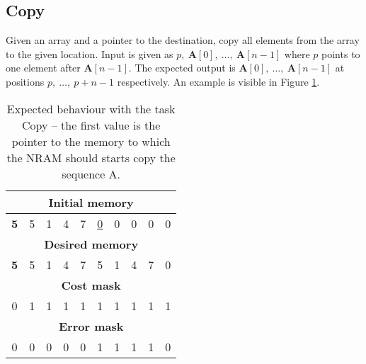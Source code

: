 \subsection{Copy}
Given an array and a pointer to the destination, copy all elements from the array to the given location. Input is given as $p,\ \textbf{A}[0],\ \dots,\ \textbf{A}[n-1]$ where $p$ points to one element after $\textbf{A}[n-1]$. The expected output is $\textbf{A}[0],\ \dots,\ \textbf{A}[n-1]$ at positions $p,\ \dots,\ p+n-1$ respectively. An example is visible in Figure \ref{fig:copy-example}.
\begin{table}[h!]
	\centering
	\begin{tabular}{|c|c|c|c|c|c|c|c|c|c|}
		\hline
		\multicolumn{10}{|c|}{\textbf{Initial memory}} \\ \hline
		\textbf{5} & 5 & 1 & 4 & 7 & \underline{0} & 0 & 0 & 0 & 0 \\ \hline\hline\hline
		\multicolumn{10}{|c|}{\textbf{Desired memory}} \\ \hline
		\textbf{5} & 5 & 1 & 4 & 7 & 5 & 1 & 4 & 7 & 0 \\ \hline\hline\hline
		\multicolumn{10}{|c|}{\textbf{Cost mask}} \\ \hline
		0 & 1 & 1 & 1 & 1 & 1 & 1 & 1 & 1 & 1 \\ \hline\hline\hline
		
		\multicolumn{10}{|c|}{\textbf{Error mask}} \\ \hline
		0 & 0 & 0 & 0 & 0 & 1 & 1 & 1 & 1 & 0 \\ \hline
	\end{tabular}
	\caption{Expected behaviour with the task Copy -- the first value is the pointer to the memory to which the NRAM should starts copy the sequence A. }
	\label{fig:copy-example}
\end{table}
\FloatBarrier
